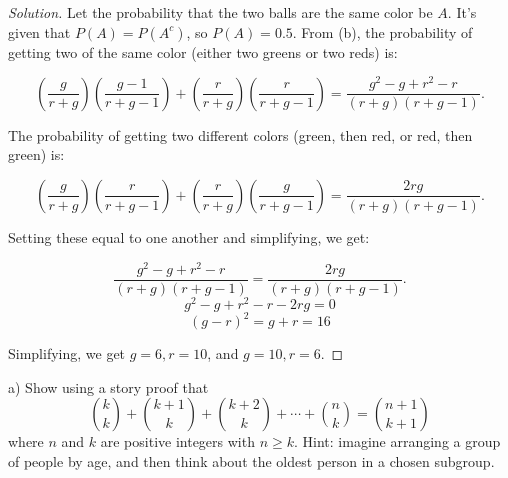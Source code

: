 \documentclass[10pt]{article}
\newenvironment{problem}[2][Problem]{\begin{trivlist}
\item[\hskip \labelsep {\bfseries #1}\hskip \labelsep {\bfseries #2.}]}{\end{trivlist}}
\begin{document}
\begin{proof}[Solution]

Let the probability that the two balls are the same color be $A$. It's given that $P(A) = P(A^c)$, so $P(A) = 0.5$. From (b), the probability of getting two of the same color (either two greens or two reds) is:

\[
\left(\frac{g}{r + g}\right) \left(\frac{g - 1}{r + g - 1}\right) + \left(\frac{r}{r + g}\right) \left(\frac{r}{r + g - 1}\right) = \frac{g^2 - g + r^2 - r}{(r + g) (r + g - 1)}.
\]

The probability of getting two different colors (green, then red, or red, then green) is:

\[
\left(\frac{g}{r + g}\right) \left(\frac{r}{r + g - 1}\right) + \left(\frac{r}{r + g}\right) \left(\frac{g}{r + g - 1}\right) = \frac{2rg}{(r + g) (r + g - 1)}.
\]

Setting these equal to one another and simplifying, we get:

\[
\frac{g^2 - g + r^2 - r}{(r + g) (r + g - 1)} = \frac{2rg}{(r + g) (r + g - 1)}.
\]
\[
g^2 - g + r^2 - r - 2rg = 0
\]
\[
(g-r)^2 = g + r = 16
\]

Simplifying, we get $g = 6, r = 10$, and $g = 10, r = 6$.

\end{proof}

\begin{problem}{7} 
(a) Show using a story proof that
\[
    \binom{k}{k} + \binom{k + 1}{k} + \binom{k + 2}{k} + \cdots + \binom{n}{k} = \binom{n + 1}{k + 1} 
\]
where $n$ and $k$ are positive integers with $n \geq k$.
Hint: imagine arranging a group of people by age, and then think about the oldest person in a chosen subgroup.
\end{problem}
\end{document}
